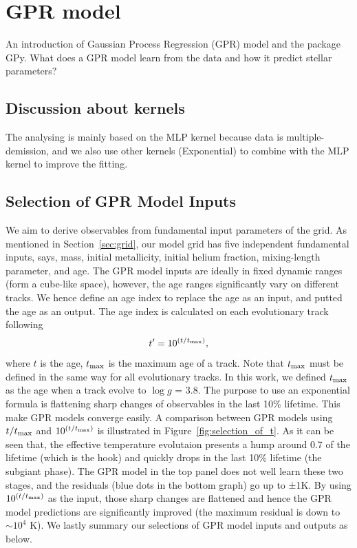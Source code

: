 \section{GPR model}\label{GPR}

An introduction of Gaussian Process Regression (GPR) model and the package GPy. What does a GPR model learn from the data and how it predict stellar parameters?  

\subsection{Discussion about kernels}
 The analysing is mainly based on the MLP kernel because data is multiple-demission, and we also use other kernels (Exponential) to combine with the MLP kernel to improve the fitting. 

\subsection{Selection of GPR Model Inputs}
We aim to derive observables from fundamental input parameters of the grid. As mentioned in Section~\ref{sec:grid}, our model grid has five independent fundamental inputs, says, mass, initial metallicity, initial helium fraction, mixing-length parameter, and age. The GPR model inputs are ideally in fixed dynamic ranges (form a cube-like space), however, the age ranges significantly vary on different tracks. We hence define an age index to replace the age as an input, and putted the age as an output. The age index is calculated on each evolutionary track following 
\begin{equation}
 t' = 10^{(t/t_{\rm max})},
\end{equation}
where $t$ is the age, $t_{\rm max}$ is the maximum age of a track. Note that $t_{\rm max}$ must be defined in the same way for all evolutionary tracks. In this work, we defined $t_{\rm max}$ as the age when a track evolve to $\log g$ = 3.8. The purpose to use an exponential formula is flattening sharp changes of observables in the last 10\% lifetime. This make GPR models converge easily. A comparison between GPR models using $t/t_{\rm max}$ and $10^{(t/t_{\rm max})}$ is illustrated in Figure~\ref{fig:selection_of_t}.  As it can be seen that, the effective temperature evolutaion presents a hump around 0.7 of the lifetime (which is the hook) and quickly drops in the last 10\% lifetime (the subgiant phase). The GPR model in the top panel does not well learn these two stages, and the residuals (blue dots in the bottom graph) go up to ±1K. By using $10^{(t/t_{\rm max})}$ as the input, those sharp changes are flattened and hence the GPR model predictions are significantly improved (the maximum residual is down to $\sim10^{4}$ K). We lastly summary our selections of GPR model inputs and outputs as below. 
